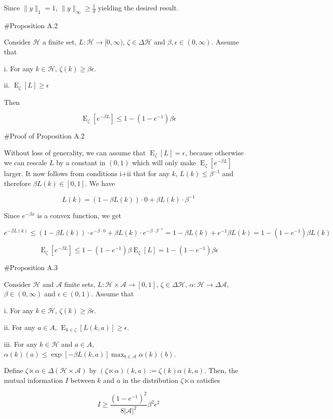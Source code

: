 \documentclass[a4paper]{article}
\newcommand{\E}{\operatorname{E}}
\newcommand{\Abs}[1]{\lvert #1 \rvert}
\newcommand{\Norm}[1]{\lVert #1 \rVert}
\newcommand{\A}{\mathcal{A}}
\newcommand{\Hy}{\mathcal{H}}
\begin{document}
Since $\Norm{y}_1 = 1$, $\Norm{y}_\infty \geq \frac{1}{d}$ yielding the desired result.

\#Proposition A.2

Consider $\Hy$ a finite set, $L: \Hy \rightarrow [0,\infty)$, $\zeta \in \Delta\Hy$ and $\beta,\epsilon \in (0,\infty)$. Assume that

i. For any $k \in \Hy$, $\zeta(k) \geq \beta\epsilon$.

ii. $\E_{\zeta}[L] \geq \epsilon$

Then

$$\E_{\zeta}[e^{-\beta L}] \leq 1 - (1 - e^{-1})\beta\epsilon$$

\#Proof of Proposition A.2

Without loss of generality, we can assume that $\E_\zeta[L] = \epsilon$, because otherwise we can rescale $L$ by a constant in $(0,1)$ which will only make $\E_{\zeta}[e^{-\beta L}]$ larger. It now follows from conditions i+ii that for any $k$, $L(k) \leq \beta^{-1}$ and therefore $\beta L(k) \in [0,1]$. We have

$$L(k) = (1 - \beta L(k)) \cdot 0 + \beta L(k) \cdot \beta^{-1}$$

Since $e^{-\beta x}$ is a convex function, we get

$$e^{-\beta L(k)} \leq (1 - \beta L(k)) \cdot e^{-\beta \cdot 0} + \beta L(k) \cdot e^{-\beta \cdot \beta^{-1}} = 1 - \beta L(k) + e^{-1} \beta L(k) = 1-(1-e^{-1})\beta L(k)$$

$$\E_\zeta[e^{-\beta L}] \leq 1-(1-e^{-1})\beta \E_\zeta[L] = 1-(1-e^{-1})\beta\epsilon$$

\#Proposition A.3

Consider $\Hy$ and $\A$ finite sets, $L: \Hy \times \A \rightarrow [0,1]$, $\zeta \in \Delta\Hy$, $\alpha: \Hy \rightarrow \Delta\A$, $\beta \in (0,\infty)$ and $\epsilon \in (0,1)$. Assume that

i. For any $k \in \Hy$, $\zeta(k) \geq \beta\epsilon$.

ii. For any $a \in A$, $\E_{k \in \zeta}[L(k,a)] \geq \epsilon$.

iii. For any $k \in \Hy$ and $a \in A$, $\alpha(k)(a) \leq \exp[-\beta L(k,a)] \max_{b \in \A} \alpha(k)(b)$.

Define $\zeta \ltimes \alpha \in \Delta(\Hy \times \A)$ by $(\zeta \ltimes \alpha)(k,a):=\zeta(k)\alpha(k,a)$. Then,  the mutual information $I$ between $k$ and $a$ in the distribution $\zeta \ltimes \alpha$ satisfies

$$I \geq \frac{(1-e^{-1})^2}{8\Abs{\A}^2} \beta^2 \epsilon^2$$
\end{document}
